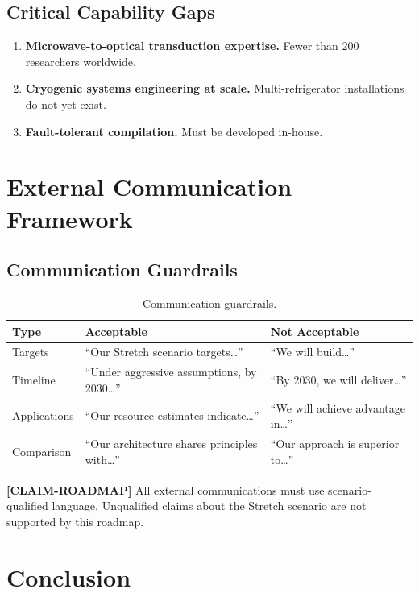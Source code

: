 \documentclass[conference]{IEEEtran}
\begin{document}
\subsection{Critical Capability Gaps}

\begin{enumerate}[leftmargin=*]
\item \textbf{Microwave-to-optical transduction expertise.} Fewer than 200 researchers worldwide.
\item \textbf{Cryogenic systems engineering at scale.} Multi-refrigerator installations do not yet exist.
\item \textbf{Fault-tolerant compilation.} Must be developed in-house.
\end{enumerate}

\section{External Communication Framework}

\subsection{Communication Guardrails}

\begin{table}[H]
\centering
\caption{Communication guardrails.}
\label{tab:comm_guardrails}
\begin{tabular}{@{}l L{3.5cm} L{3.5cm}@{}}
\toprule
\textbf{Type} & \textbf{Acceptable} & \textbf{Not Acceptable} \\
\midrule
Targets & ``Our Stretch scenario targets\ldots'' & ``We will build\ldots'' \\
Timeline & ``Under aggressive assumptions, by 2030\ldots'' & ``By 2030, we will deliver\ldots'' \\
Applications & ``Our resource estimates indicate\ldots'' & ``We will achieve advantage in\ldots'' \\
Comparison & ``Our architecture shares principles with\ldots'' & ``Our approach is superior to\ldots'' \\
\bottomrule
\end{tabular}
\end{table}

\textbf{[CLAIM-ROADMAP]} All external communications must use scenario-qualified language. Unqualified claims about the Stretch scenario are not supported by this roadmap.

\section{Conclusion}
\end{document}
